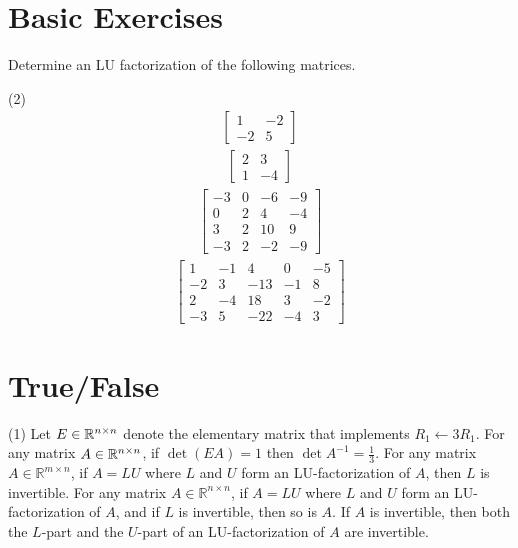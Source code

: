 \section{Basic Exercises}

Determine an LU factorization of the following matrices.
\begin{tasks}[style=enumerate](2)
\task
  \begin{align*}
    \begin{bmatrix}
      1 & -2 \\
      -2 & 5
    \end{bmatrix}
  \end{align*}
\task
  \begin{align*}
    \begin{bmatrix}
      2 & 3 \\
      1 & -4
    \end{bmatrix}
  \end{align*}
\task
  \begin{align*}
    \begin{bmatrix}
      -3 & 0 & -6 & -9 \\
      0 & 2 & 4 & -4 \\
      3 & 2 & 10 & 9 \\
      -3 & 2 & -2 & -9
    \end{bmatrix}
  \end{align*}
\task
  \begin{align*}
    \begin{bmatrix}
      1 & -1 & 4 & 0 & -5 \\
      -2 & 3 & -13 & -1 & 8 \\
      2 & -4 & 18 & 3 & -2 \\
      -3 & 5 & -22 & -4 & 3
    \end{bmatrix}
  \end{align*}
\end{tasks}

\section{True/False}

\trueFalseHeader

\begin{tasks}[resume, style=enumerate](1)
\task
  Let $E \in \mathbb R^{n \times n}$ denote the elementary matrix that
  implements $R_1 \gets 3 R_1$. For any matrix $A \in \mathbb R^{n \times
    n}$, if $\det(EA) = 1$ then $\det A^{-1} = \frac{1}{3}$.
\task
  For any matrix $A \in \mathbb R^{m \times n}$, if $A = LU$ where $L$
  and $U$ form an LU-factorization of $A$, then $L$ is invertible.
\task
  For any matrix $A \in \mathbb R^{n \times n}$, if $A = LU$ where $L$
  and $U$ form an LU-factorization of $A$, and if $L$ is invertible,
  then so is $A$.
\task
  If $A$ is invertible, then both the $L$-part and the $U$-part of an
  LU-factorization of $A$ are invertible.
\end{tasks}

